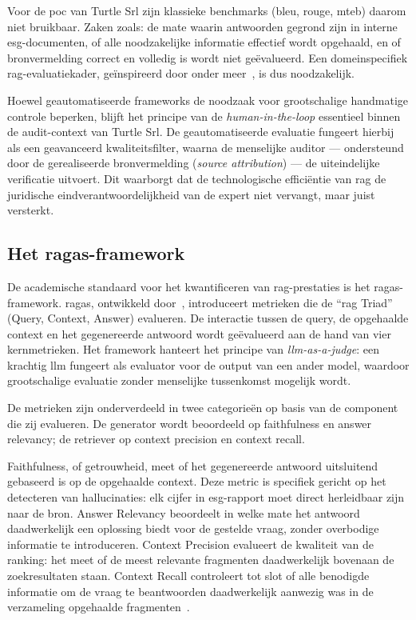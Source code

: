 Voor de \gls{poc} van Turtle Srl zijn klassieke benchmarks (\gls{bleu}, \gls{rouge}, \gls{mteb}) daarom niet bruikbaar. Zaken zoals: de mate waarin antwoorden gegrond zijn in interne \gls{esg}-documenten, of alle noodzakelijke informatie effectief wordt opgehaald, en of bronvermelding correct en volledig is wordt niet geëvalueerd. Een domeinspecifiek \gls{rag}-evaluatiekader, geïnspireerd door onder meer~\textcite{Yu2024}, is dus noodzakelijk.

Hoewel geautomatiseerde frameworks de noodzaak voor grootschalige handmatige controle beperken, blijft het principe van de \textit{human-in-the-loop} essentieel binnen de audit-context van Turtle Srl. De geautomatiseerde evaluatie fungeert hierbij als een geavanceerd kwaliteitsfilter, waarna de menselijke auditor — ondersteund door de gerealiseerde bronvermelding (\textit{source attribution}) — de uiteindelijke verificatie uitvoert. Dit waarborgt dat de technologische efficiëntie van \gls{rag} de juridische eindverantwoordelijkheid van de expert niet vervangt, maar juist versterkt.

\subsection{Het \gls{ragas}-framework}

De academische standaard voor het kwantificeren van \gls{rag}-prestaties is het \gls{ragas}-framework. \gls{ragas}, ontwikkeld door~\textcite{Es2024}, introduceert metrieken die de ``\gls{rag} Triad'' (Query, Context, Answer) evalueren. De interactie tussen de query, de opgehaalde context en het gegenereerde antwoord wordt geëvalueerd aan de hand van vier kernmetrieken. Het framework hanteert het principe van \textit{\gls{llm}-as-a-judge}: een krachtig \gls{llm} fungeert als evaluator voor de output van een ander model, waardoor grootschalige evaluatie zonder menselijke tussenkomst mogelijk wordt.

De metrieken zijn onderverdeeld in twee categorieën op basis van de component die zij evalueren. De generator wordt beoordeeld op faithfulness en answer relevancy; de retriever op context precision en context recall.

Faithfulness, of getrouwheid, meet of het gegenereerde antwoord uitsluitend gebaseerd is op de opgehaalde context. Deze metric is specifiek gericht op het detecteren van hallucinaties: elk cijfer in \gls{esg}-rapport moet direct herleidbaar zijn naar de bron. Answer Relevancy beoordeelt in welke mate het antwoord daadwerkelijk een oplossing biedt voor de gestelde vraag, zonder overbodige informatie te introduceren. Context Precision evalueert de kwaliteit van de ranking: het meet of de meest relevante fragmenten daadwerkelijk bovenaan de zoekresultaten staan. Context Recall controleert tot slot of alle benodigde informatie om de vraag te beantwoorden daadwerkelijk aanwezig was in de verzameling opgehaalde fragmenten~\autocite{Dong2025,Roychowdhury2024}.

